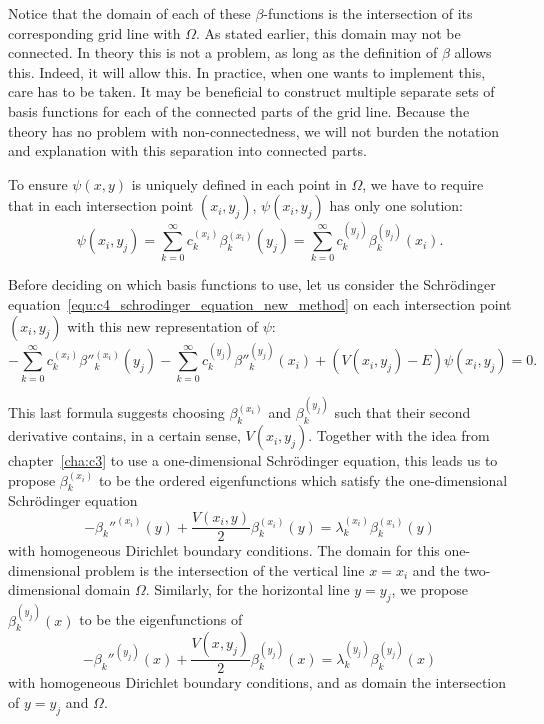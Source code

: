 Notice that the domain of each of these $\beta$-functions is the intersection of its corresponding grid line with $\Omega$. As stated earlier, this domain may not be connected. In theory this is not a problem, as long as the definition of $\beta$ allows this. Indeed, it will allow this. In practice, when one wants to implement this, care has to be taken. It may be beneficial to construct multiple separate sets of basis functions for each of the connected parts of the grid line. Because the theory has no problem with non-connectedness, we will not burden the notation and explanation with this separation into connected parts.

To ensure $\psi(x, y)$ is uniquely defined in each point in $\Omega$, we have to require that in each intersection point $(x_i, y_j)$, $\psi(x_i, y_j)$ has only one solution:
\begin{equation}\label{equ:c4_new_method_pre_matrix_equality}
    \psi(x_i, y_j) = \sum_{k=0}^\infty c_k^{(x_i)} \beta_k^{(x_i)}(y_j) = \sum_{k=0}^\infty c_k^{(y_j)} \beta_k^{(y_j)}(x_i)\text{.}
\end{equation}

Before deciding on which basis functions to use, let us consider the Schrödinger equation~\eqref{equ:c4_schrodinger_equation_new_method} on each intersection point $(x_i, y_j)$ with this new representation of $\psi$:
$$
    -\sum_{k=0}^\infty c_k^{(x_i)} \beta''^{(x_i)}_k(y_j) - \sum_{k=0}^\infty c_k^{(y_j)} \beta''^{(y_j)}_k(x_i) + (V(x_i, y_j) - E) \psi(x_i, y_j) = 0\text{.}
$$

This last formula suggests choosing $\beta_k^{(x_i)}$ and $\beta_k^{(y_j)}$ such that their second derivative contains, in a certain sense, $V(x_i, y_j)$. Together with the idea from chapter~\ref{cha:c3} to use a one-dimensional Schrödinger equation, this leads us to propose $\beta_k^{(x_i)}$ to be the ordered eigenfunctions which satisfy the one-dimensional Schrödinger equation
$$
    -\beta_k''^{(x_i)}(y) + \frac{V(x_i, y)}{2}\beta_k^{(x_i)}(y) = \lambda_k^{(x_i)} \beta_k^{(x_i)}(y)
$$
with homogeneous Dirichlet boundary conditions. The domain for this one-dimensional problem is the intersection of the vertical line $x = x_i$ and the two-dimensional domain $\Omega$. Similarly, for the horizontal line $y = y_j$, we propose $\beta_k^{(y_j)}(x)$ to be the eigenfunctions of
$$
    -\beta_k''^{(y_j)}(x) + \frac{V(x, y_j)}{2}\beta_k^{(y_j)}(x) = \lambda_k^{(y_j)} \beta_k^{(y_j)}(x)
$$
with homogeneous Dirichlet boundary conditions, and as domain the intersection of $y = y_j$ and $\Omega$.

